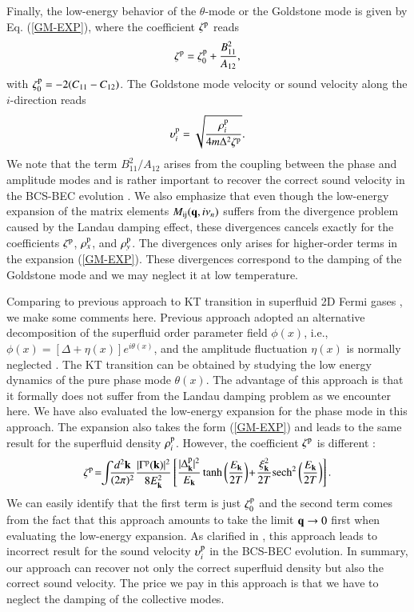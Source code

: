 \documentclass[aps,prd,amsmath,two column,nofootinbib,amssymb,referee]{revtex4}
\begin{document}
Finally, the low-energy behavior of the $\theta$-mode or the Goldstone mode is given by Eq. (\ref{GM-EXP}), where the coefficient $\zeta^{\rm p}$ reads
\begin{eqnarray}
\zeta^{\rm p}=\zeta_0^{\rm p}+\frac{B_{11}^2}{A_{12}},
\end{eqnarray}
with $\zeta_0^{\rm p}=-2(C_{11}-C_{12})$.  The Goldstone mode velocity or sound velocity along the $i$-direction reads 
\begin{eqnarray}
\upsilon_i^{\rm p}=\sqrt{\frac{\rho_i^{\rm p}}{4m\Delta^2\zeta^{\rm p}}}.
\end{eqnarray}
We note that the term $B_{11}^2/A_{12}$ arises from the coupling between the phase and amplitude modes and is rather important to recover the correct sound velocity in the
BCS-BEC evolution \cite{BKT-S08}. We also emphasize that even though the  low-energy expansion of the matrix elements $M_{\rm ij}({\bf q},i\nu_n)$ suffers from the divergence problem 
caused by the Landau damping effect, these divergences cancels exactly for the coefficients $\zeta^{\rm p}$, $\rho_x^{\rm p}$, and $\rho_y^{\rm p}$. The divergences only arises for higher-order terms in the 
expansion (\ref{GM-EXP}).  These divergences correspond to the damping of the Goldstone mode and we may neglect it at low temperature.


Comparing to previous approach to KT transition in superfluid 2D Fermi gases \cite{Loktev2001,Botelho2006,BKT-S04}, we make some comments here. Previous approach adopted an alternative decomposition of the superfluid order parameter field $\phi(x)$, i.e., $\phi(x)=[\Delta+\eta(x)]e^{i\theta(x)}$, and the amplitude fluctuation $\eta(x)$ is normally neglected \cite{Loktev2001,Botelho2006,BKT-S04}. The KT transition can be obtained by studying the low energy dynamics of the pure phase mode $\theta(x)$. The advantage of this approach is that it formally does not suffer from the Landau damping problem as we encounter here. We have also evaluated the low-energy expansion for the phase mode in this approach. The expansion also takes the form (\ref{GM-EXP}) and leads to the same result for the superfluid density $\rho_i^{\rm p}$.
However,  the coefficient ${\zeta}^{\rm p}$ is different \cite{Botelho2006}:
\begin{eqnarray}
{\zeta}^{\rm p}\!=\!\!\int\!\!\! {d^2{\bf k}\over(2\pi)^2}{|\Gamma^{\rm p}({\bf k})|^2\over8E_{\bf k}^2}\left[{|\Delta_{\bf k}^{\rm p}|^2\over E_{\bf k}}\tanh\left({E_{\bf k}\over2T}\right)\!+\!\frac{\xi_{\bf k}^2}{2T}{\rm sech}^2\left({E_{\bf k}\over2T}\right)\right].
\end{eqnarray}
We can easily identify that the first term is just $\zeta_0^{\rm p}$ and the second term comes from the fact that this approach amounts to take the limit ${\bf q}\rightarrow0$ first when evaluating the low-energy expansion. As clarified in \cite{BKT-S08}, this approach leads to incorrect result for the sound velocity $\upsilon_i^{\rm p}$ in the BCS-BEC evolution.  In summary,  our approach can recover not only the correct superfluid density but also the correct sound velocity. The price we pay in this approach is that we have to neglect the damping of the collective modes.
\end{document}

